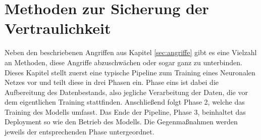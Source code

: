 \chapter{Methoden zur Sicherung der Vertraulichkeit}\label{ch:methoden}

Neben den beschriebenen Angriffen aus Kapitel \ref{sec:angriffe} gibt es eine Vielzahl an Methoden, diese Angriffe abzuschwächen oder sogar ganz zu unterbinden.
Dieses Kapitel stellt zuerst eine typische Pipeline zum Training eines Neuronalen Netzes vor und teilt diese in drei Phasen ein.
Phase eins ist dabei die Aufbereitung des Datenbestands, also jegliche Verarbeitung der Daten, die vor dem eigentlichen Training stattfinden.
Anschließend folgt Phase 2, welche das Training des Modells umfasst.
Das Ende der Pipeline, Phase 3, beinhaltet das Deployment so wie den Betrieb des Modells.
Die Gegenmaßnahmen werden jeweils der entsprechenden Phase untergeordnet.





